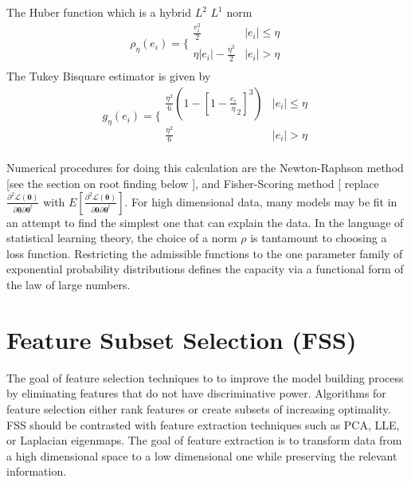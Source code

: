 The Huber function which is a hybrid $L^2$ $L^1$ norm
\begin{equation}
\rho_\eta(e_i)=\biggl\{\begin{array}{cc}
\frac{e_i^2}{2} & |e_i| \leq \eta \\
  \eta |e_i| - \frac{\eta^2}{2} & |e_i| > \eta \\
\end{array}
\end{equation}
The  Tukey Bisquare estimator is given by
\begin{equation}
g_\eta(e_i)=\biggl\{ \begin{array}{cc} \frac{\eta^2}{6} (
1-[1-\frac{e_i}{\eta}_2]^3) & |e_i| \leq \eta \\
\frac{\eta^2}{6} & |e_i| > \eta \\
\end{array}
\end{equation}

Numerical procedures for doing this calculation are the Newton-Raphson method [see the section on root finding below ], and Fisher-Scoring method [ replace $ \frac{\partial^2 \mathcal{L}(\mathbf{\theta})}{\partial \mathbf{\theta} \partial \mathbf{\theta}^{t} }$ with $E[ \frac{\partial^2 \mathcal{L}(\mathbf{\theta})}{\partial \mathbf{\theta} \partial \mathbf{\theta}^{t} }  ]$. For high dimensional data, many models may be fit in an attempt to find the simplest one that can explain the data.  In the language of statistical learning theory, the choice of a norm $\rho$ is tantamount to choosing a loss function. Restricting the admissible functions to the one parameter family of exponential probability distributions defines the capacity via a functional form of the law of large numbers. \cite{Scholkopf B. (2002)}



\section*{Feature Subset Selection (FSS)}The goal of feature selection techniques to to improve the model building process by eliminating features that do not have discriminative power. Algorithms for feature selection either rank features or create subsets of increasing optimality.  FSS should be contrasted with feature extraction techniques such as PCA, LLE, or Laplacian eigenmaps.  The goal of feature extraction is to transform data from a high dimensional space to a low dimensional one while preserving the relevant information.

